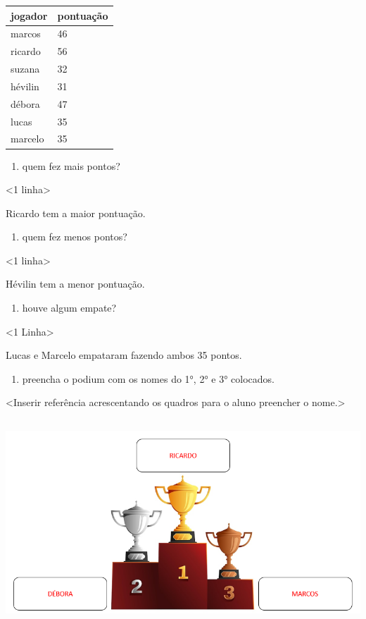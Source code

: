 \begin{longtable}[]{@{}ll@{}}
\toprule
jogador & pontuação\tabularnewline
\midrule
\endhead
marcos & 46\tabularnewline
ricardo & 56\tabularnewline
suzana & 32\tabularnewline
hévilin & 31\tabularnewline
débora & 47\tabularnewline
lucas & 35\tabularnewline
marcelo & 35\tabularnewline
\bottomrule
\end{longtable}

\begin{enumerate}
\def\labelenumi{\Alph{enumi})}
\item
  quem fez mais pontos?
\end{enumerate}

\textless{}1 linha\textgreater{}

Ricardo tem a maior pontuação.

\begin{enumerate}
\def\labelenumi{\Alph{enumi})}
\item
  quem fez menos pontos?
\end{enumerate}

\textless{}1 linha\textgreater{}

Hévilin tem a menor pontuação.

\begin{enumerate}
\def\labelenumi{\Alph{enumi})}
\item
  houve algum empate?
\end{enumerate}

\textless{}1 Linha\textgreater{}

Lucas e Marcelo empataram fazendo ambos 35 pontos.

\begin{enumerate}
\def\labelenumi{\Alph{enumi})}
\item
  preencha o podium com os nomes do 1°, 2° e 3° colocados.
\end{enumerate}

\textless{}Inserir referência acrescentando os quadros para o aluno
preencher o nome.\textgreater{}

\includegraphics[width=5.90556in,height=3.03472in]{media/image96.png}

